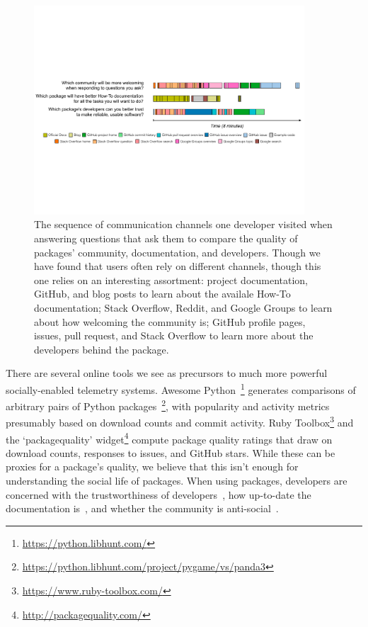 \begin{figure}
\centering
\includegraphics[width=0.9\textwidth]{figures/visits}
\caption{%
The sequence of communication channels one developer visited when answering questions that ask them to compare the quality of packages' community, documentation, and developers.
Though we have found that users often rely on different channels, though this one relies on an interesting assortment:
project documentation, GitHub, and blog posts to learn about the availale How-To documentation;
Stack Overflow, Reddit, and Google Groups to learn about how welcoming the community is;
GitHub profile pages, issues, pull request, and Stack Overflow to learn more about the developers behind the package.
}
\label{fig:visits}
\end{figure}

There are several online tools we see as precursors to much more powerful socially-enabled telemetry systems.
Awesome Python~\footnote{\url{https://python.libhunt.com/}} generates comparisons of arbitrary pairs of Python packages~\footnote{\url{https://python.libhunt.com/project/pygame/vs/panda3}}, with popularity and activity metrics presumably based on download counts and commit activity.
Ruby Toolbox\footnote{\url{https://www.ruby-toolbox.com/}} and the `packagequality' widget\footnote{\url{http://packagequality.com/}} compute package quality ratings that draw on download counts, responses to issues, and GitHub stars.
While these can be proxies for a package's quality, we believe that this isn't enough for understanding the social life of packages.
When using packages, developers are concerned with the trustworthiness of developers~\cite{robillard_field_2011}, how up-to-date the documentation is~\cite{storey_revolution_2014,nykaza_what_2002,lethbridge_how_2003,robillard_field_2011}, and whether the community is anti-social~\cite{storey_revolution_2014}.

